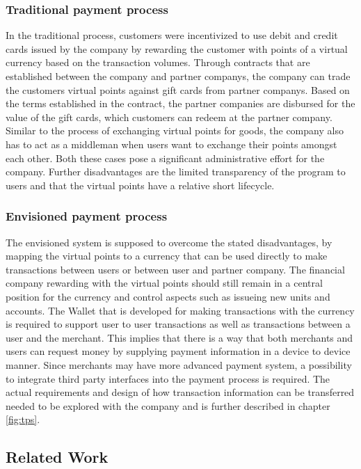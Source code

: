 \documentclass[a4paper]{article}
\begin{document}
\subsubsection{Traditional payment process}
In the traditional process, customers were incentivized to use debit and credit cards issued by the company by rewarding the customer with points of a virtual currency based on the transaction volumes.
Through contracts that are established between the company and partner companys, the company can trade the customers virtual points against gift cards from partner companys.
Based on the terms established in the contract, the partner companies are disbursed for the value of the gift cards, which customers can redeem at the partner company.
Similar to the process of exchanging virtual points for goods, the company also has to act as a middleman when users want to exchange their points amongst each other. Both these cases pose a significant administrative effort for the company. Further disadvantages are the limited transparency of the program to users and that the virtual points have a relative short lifecycle.

\subsubsection{Envisioned payment process}
The envisioned system is supposed to overcome the stated disadvantages, by mapping the virtual points to a currency that can be used directly to make transactions between users or between user and partner company.
The financial company rewarding with the virtual points should still remain in a central position for the currency and control aspects such as issueing new units and accounts.
The Wallet that is developed for making transactions with the currency is required to support user to user transactions as well as transactions between a user and the merchant. This implies that there is a way that both merchants and users can request money by supplying payment information in a device to device manner. Since merchants may have more advanced payment system, a possibility to integrate third party interfaces into the payment process is required. The actual requirements and design of how transaction information can be transferred needed to be explored with the company and is further described in chapter \ref{fig:tps}.


\subsection{Related Work}
\end{document}
